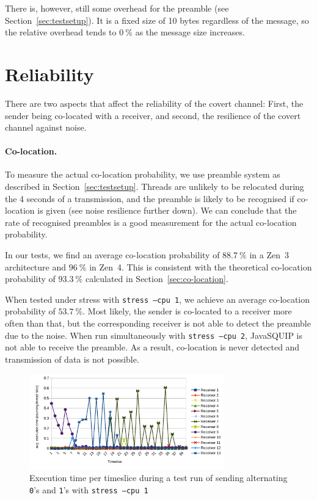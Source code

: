 \documentclass[11pt,
  titlepage=false,
  parskip=half,      %
]{scrreprt}
\begin{document}
There is, however, still some overhead for the preamble (see Section~\ref{sec:testsetup}).
It is a fixed size of 10 bytes regardless of the message,
so the relative overhead tends to $0~\%$ as the message size increases.

\section{Reliability}
There are two aspects that affect the reliability of the covert channel:
First, the sender being co-located with a receiver, and second, the resilience of the covert channel against noise.

\paragraph{Co-location.}
To measure the actual co-location probability, we use preamble system as described in Section~\ref{sec:testsetup}.
Threads are unlikely to be relocated during the 4 seconds of a transmission,
and the preamble is likely to be recognised if co-location is given (see noise resilience further down).
We can conclude that the rate of recognised preambles is a good measurement for the actual co-location probability.

In our tests, we find an average co-location probability of $88.7~\%$ in a Zen~3 architecture and $96~\%$ in Zen~4.
This is consistent with the theoretical co-location probability of $93.3~\%$ calculated in Section~\ref{sec:co-location}.

When tested under stress with \texttt{stress --cpu 1}, we achieve an average co-location probability of $53.7~\%$.
Most likely, the sender is co-located to a receiver more often than that,
but the corresponding receiver is not able to detect the preamble due to the noise.
When run simultaneously with \texttt{stress --cpu 2}, JavaSQUIP is not able to receive the preamble.
As a result, co-location is never detected and transmission of data is not possible.

\begin{figure}
    \centering
    \includegraphics[width=0.75\textwidth]{figures/contentiontest_stress}

    \caption{Execution time per timeslice during a test run of sending alternating \texttt{0}'s and \texttt{1}'s with \texttt{stress --cpu 1}}
    \label{fig:contentiontest_stress}
\end{figure}
\end{document}
